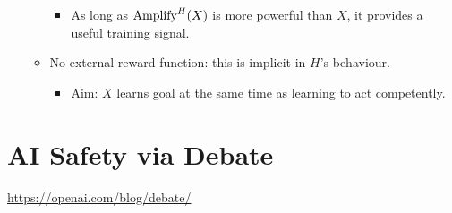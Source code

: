 \begin{itemize}
\begin{itemize}
\begin{itemize}
            \item As long as $\operatorname{\mathrm{Amplify}}^H(X)$ is more powerful than $X$, it provides a useful training signal.
        \end{itemize}
        \item No external reward function: this is implicit in $H$'s behaviour.
        \begin{itemize}
            \item Aim: $X$ learns goal at the same time as learning to act competently.
        \end{itemize}
    \end{itemize}
\end{itemize}


\section{AI Safety via Debate}

\url{https://openai.com/blog/debate/}

